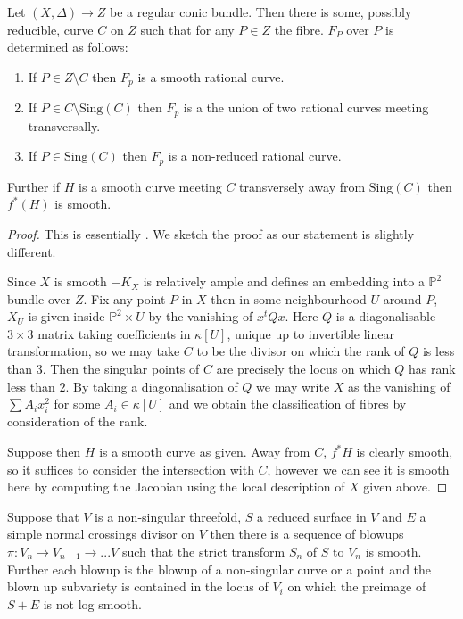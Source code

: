 \documentclass[a4paper,12pt]{book}
\newcommand{\Sing}{\text{Sing}}
\begin{document}
	\begin{lemma}
	Let $(X,\Delta) \to Z$ be a regular conic bundle. Then there is some, possibly reducible, curve $C$ on $Z$ such that for any $P \in Z$ the fibre. $F_{P}$ over $P$ is determined as follows:
	\begin{enumerate}
		\item If $P \in Z\setminus C$ then $F_{p}$ is a smooth rational curve.
		\item If $P \in C\setminus \Sing(C)$ then $F_{p}$ is a the union of two rational curves meeting transversally.
		\item If $P \in \Sing(C)$ then $F_{p}$ is a non-reduced rational curve.
	\end{enumerate}
	Further if $H$ is a smooth curve meeting $C$ transversely away from $\Sing(C)$ then $f^{*}(H)$ is smooth.
\end{lemma}
\begin{proof}
	This is essentially \cite[Proposition 1.8]{sarkisov1983conic}. We sketch the proof as our statement is slightly different.
	
	Since $X$ is smooth $-K_{X}$ is relatively ample and defines an embedding into a $\mathbb{P}^{2}$ bundle over $Z$.
	Fix any point $P$ in $X$ then in some neighbourhood $U$ around $P$, $X_{U}$ is given inside $\mathbb{P}^{2} \times U$ by the vanishing of $x^{t}Qx$. Here $Q$ is a diagonalisable $3\times 3$ matrix taking coefficients in $\kappa[U]$, unique up to invertible linear transformation, so we may take $C$ to be the divisor on which the rank of $Q$ is less than $3$. Then the singular points of $C$ are precisely the locus on which $Q$ has rank less than $2$. By taking a diagonalisation of $Q$ we may write $X$ as the vanishing of $\sum A_{i}x_{i}^{2}$ for some $A_{i} \in \kappa[U]$ and we obtain the classification of fibres by consideration of the rank.
	
	Suppose then $H$ is a smooth curve as given. Away from $C$, $f^{*}H$ is clearly smooth, so it suffices to consider the intersection with $C$, however we can see it is smooth here by computing the Jacobian using the local description of $X$ given above. 
\end{proof}


	\begin{theorem}\cite[Theorem 1.2]{cutkosky2009resolution}
	Suppose that $V$ is a non-singular threefold, $S$ a reduced surface in $V$ and $E$ a simple normal crossings divisor on $V$ then there is a sequence of blowups $\pi\colon V_{n} \to V_{n-1} \to ... V$ such that the strict transform $S_{n}$ of $S$ to $V_{n}$ is smooth. Further each blowup is the blowup of a non-singular curve or a point and the blown up subvariety is contained in the locus of $V_{i}$ on which the preimage of $S+E$ is not log smooth.
\end{theorem}
\end{document}
